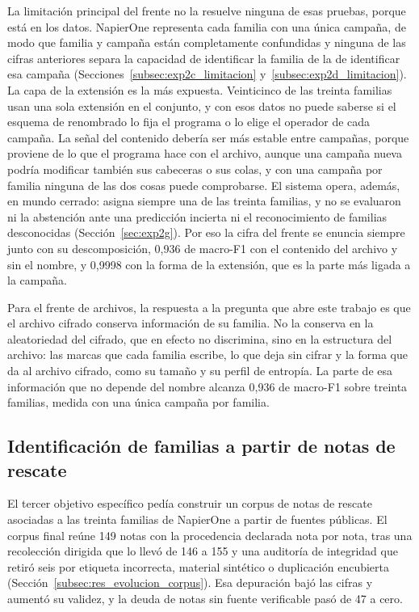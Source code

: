 La limitación principal del frente no la resuelve ninguna de esas pruebas, porque está en los datos. NapierOne representa cada familia con una única campaña, de modo que familia y campaña están completamente confundidas y ninguna de las cifras anteriores separa la capacidad de identificar la familia de la de identificar esa campaña (Secciones~\ref{subsec:exp2c_limitacion} y~\ref{subsec:exp2d_limitacion}). La capa de la extensión es la más expuesta. Veinticinco de las treinta familias usan una sola extensión en el conjunto, y con esos datos no puede saberse si el esquema de renombrado lo fija el programa o lo elige el operador de cada campaña. La señal del contenido debería ser más estable entre campañas, porque proviene de lo que el programa hace con el archivo, aunque una campaña nueva podría modificar también sus cabeceras o sus colas, y con una campaña por familia ninguna de las dos cosas puede comprobarse. El sistema opera, además, en mundo cerrado: asigna siempre una de las treinta familias, y no se evaluaron ni la abstención ante una predicción incierta ni el reconocimiento de familias desconocidas (Sección~\ref{sec:exp2g}). Por eso la cifra del frente se enuncia siempre junto con su descomposición, 0,936 de macro-F1 con el contenido del archivo y sin el nombre, y 0,9998 con la forma de la extensión, que es la parte más ligada a la campaña.

Para el frente de archivos, la respuesta a la pregunta que abre este trabajo es que el archivo cifrado conserva información de su familia. No la conserva en la aleatoriedad del cifrado, que en efecto no discrimina, sino en la estructura del archivo: las marcas que cada familia escribe, lo que deja sin cifrar y la forma que da al archivo cifrado, como su tamaño y su perfil de entropía. La parte de esa información que no depende del nombre alcanza 0,936 de macro-F1 sobre treinta familias, medida con una única campaña por familia.

\subsection{Identificación de familias a partir de notas de rescate}
\label{subsec:concl_notas}


El tercer objetivo específico pedía construir un corpus de notas de rescate asociadas a las treinta familias de NapierOne a partir de fuentes públicas. El corpus final reúne 149 notas con la procedencia declarada nota por nota, tras una recolección dirigida que lo llevó de 146 a 155 y una auditoría de integridad que retiró seis por etiqueta incorrecta, material sintético o duplicación encubierta (Sección~\ref{subsec:res_evolucion_corpus}). Esa depuración bajó las cifras y aumentó su validez, y la deuda de notas sin fuente verificable pasó de 47 a cero.

